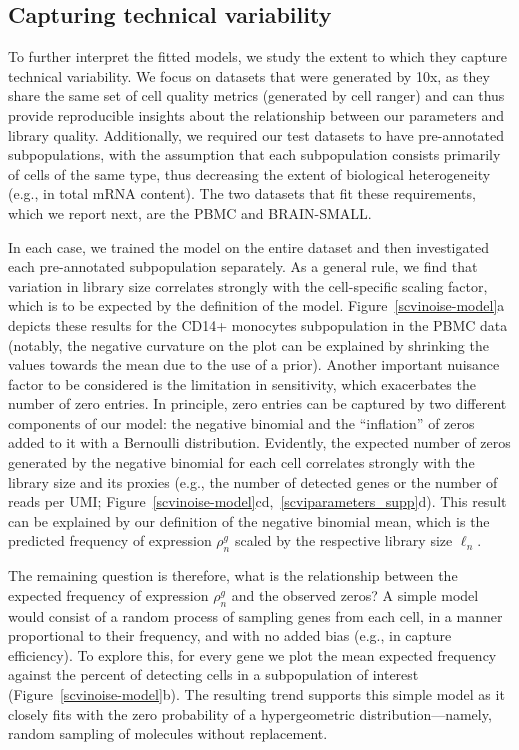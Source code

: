 \subsection{Capturing technical variability}
\label{scvitechnicalnoise_results}
To further interpret the fitted models, we study the extent to which they capture technical variability. We focus on datasets that were generated by 10x, as they share the same set of cell quality metrics (generated by cell ranger) and can thus provide reproducible insights about the relationship between our parameters and library quality. Additionally, we required our test datasets to have pre-annotated subpopulations, with the assumption that each subpopulation consists primarily of cells of the same type, thus decreasing the extent of biological heterogeneity (e.g., in total mRNA content). The two datasets that fit these requirements, which we report next, are the PBMC and BRAIN-SMALL.

In each case, we trained the model on the entire dataset and then investigated each pre-annotated subpopulation separately. As a general rule, we find that variation in library size correlates strongly with the cell-specific scaling factor, which is to be expected by the definition of the model. Figure~\ref{scvinoise-model}a depicts these results for the CD14+ monocytes subpopulation in the PBMC data (notably, the negative curvature on the plot can be explained by shrinking the values towards the mean due to the use of a prior). Another important nuisance factor to be considered is the limitation in sensitivity, which exacerbates the number of zero entries. In principle, zero entries can be captured by two different components of our model: the negative binomial and the \enquote{inflation} of zeros added to it with a Bernoulli distribution. Evidently, the expected number of zeros generated by the negative binomial for each cell correlates strongly with the library size and its proxies (e.g., the number of detected genes or the number of reads per UMI; Figure~\ref{scvinoise-model}cd,~\ref{scviparameters_supp}d). This result can be explained by our definition of the negative binomial mean, which is the predicted frequency of expression $\rho_n^g$ scaled by the respective library size $\ell_n$.

The remaining question is therefore, what is the relationship between the expected frequency of expression $\rho_n^g$ and the observed zeros? A simple model would consist of a random process of sampling genes from each cell, in a manner proportional to their frequency, and with no added bias (e.g., in capture efficiency). To explore this, for every gene we plot the mean expected frequency against the percent of detecting cells in a subpopulation of interest (Figure~\ref{scvinoise-model}b). The resulting trend supports this simple model as it closely fits with the zero probability of a hypergeometric distribution---namely, random sampling of molecules without replacement.


